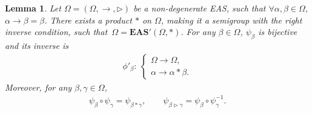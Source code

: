 \documentclass[10pt,a4paper]{amsart}
\numberwithin{equation}{section}
\newtheorem{Lemma}[Theorem]{Lemma}
\newcommand{\eas}{\mathbf{EAS}}
\begin{document}
\begin{Lemma}\label{lem3.5}
Let $\Omega=(\Omega,\rightarrow,\triangleright)$ be a non-degenerate EAS, such that
$\forall \alpha,\beta \in \Omega$, $\alpha \rightarrow \beta =\beta$.
There exists a product $*$ on $\Omega$, making it a semigroup with the right inverse condition, such that~${\Omega=\eas'(\Omega,*)}$. For any $\beta\in \Omega$, $\psi_\beta$ is bijective and its inverse is
\begin{align*}
\phi'_\beta\colon\ \begin{cases}
\Omega \longrightarrow \Omega,\\
\alpha \longrightarrow \alpha*\beta.
\end{cases}
\end{align*}
Moreover, for any $\beta,\gamma \in \Omega$,
\begin{align}
\label{eq26}
\psi_\beta \circ \psi_\gamma =\psi_{\beta*\gamma},\qquad \psi_{\beta \triangleright \gamma} =\psi_\beta \circ \psi_\gamma^{-1}.
\end{align}\end{Lemma}
\end{document}
